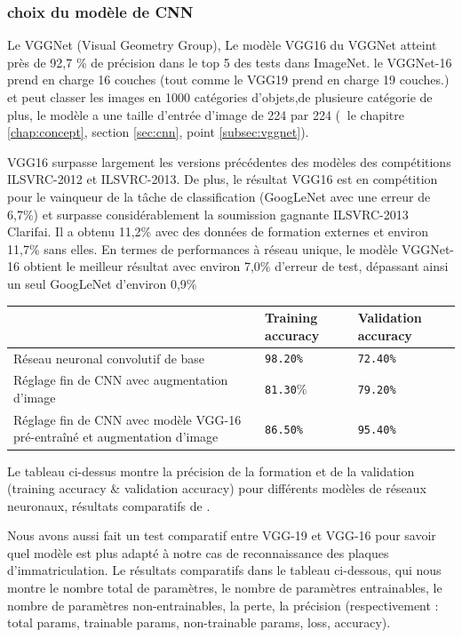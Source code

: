 	\subsubsection{choix du modèle de CNN}
	Le VGGNet (Visual Geometry Group), Le modèle VGG16 du VGGNet atteint près de 92,7 \% de précision dans le top 5 des tests dans ImageNet. le VGGNet-16 prend en charge 16 couches (tout comme le VGG19 prend en charge 19 couches.) et peut classer les images en 1000 catégories d'objets,de plusieure catégorie de plus, le modèle a une taille d'entrée d'image de 224 par 224 (\cf$ \ $ le chapitre \ref{chap:concept}, section \ref{sec:cnn}, point \ref{subsec:vggnet}).
	
	VGG16 surpasse largement les versions précédentes des modèles des compétitions ILSVRC-2012 et ILSVRC-2013. De plus, le résultat VGG16 est en compétition pour le vainqueur de la tâche de classification (GoogLeNet avec une erreur de 6,7\%) et surpasse considérablement la soumission gagnante ILSVRC-2013 Clarifai. Il a obtenu 11,2\% avec des données de formation externes et environ 11,7\% sans elles. En termes de performances à réseau unique, le modèle VGGNet-16 obtient le meilleur résultat avec environ 7,0\% d'erreur de test, dépassant ainsi un seul GoogLeNet d'environ 0,9\% \cite{simonyan2014very}
	
	

	\begin{table}[H]
		\begin{tabular}{|p{7cm}|l|l|}
			\hline
			& \textbf{Training accuracy} & \textbf{Validation accuracy} \\
			\hline
			Réseau neuronal convolutif de base & \texttt{98.20\%}  & \texttt{72.40\%} \\
			\hline
			Réglage fin de CNN avec augmentation d'image & \texttt{81.30}\% & \texttt{79.20\%} \\
			\hline
			Réglage fin de CNN avec modèle VGG-16 pré-entraîné et augmentation d'image & \texttt{86.50\%}  & \texttt{95.40\%} \\
			\hline
			
		\end{tabular}
	\end{table}

	Le tableau ci-dessus montre la précision de la formation et de la validation (training accuracy \& validation accuracy) pour différents modèles de réseaux neuronaux, résultats comparatifs de \cite{tammina2019transfer}.
	
	Nous avons aussi fait un test comparatif entre VGG-19 et VGG-16 pour savoir quel modèle est plus adapté à notre cas de reconnaissance des plaques d'immatriculation. Le résultats comparatifs dans le tableau ci-dessous, qui nous montre le nombre total de paramètres, le nombre de paramètres entrainables, le nombre de paramètres non-entrainables, la perte, la précision (respectivement : total params, trainable params, non-trainable params, loss, accuracy).
	
